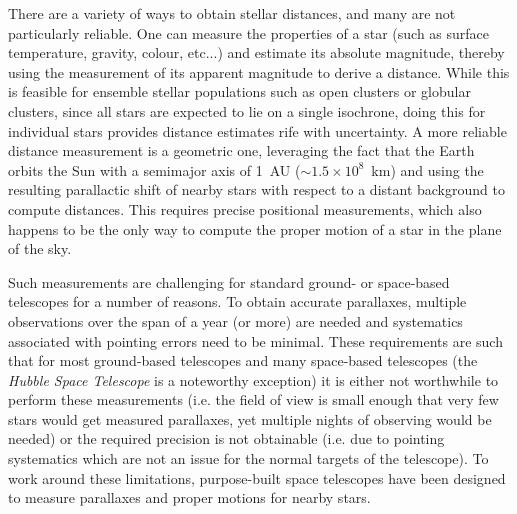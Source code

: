 There are a variety of ways to obtain stellar distances, and many are not particularly reliable. One can measure the properties of a star (such as surface temperature, gravity, colour, etc...) and estimate its absolute magnitude, thereby using the measurement of its apparent magnitude to derive a distance. While this is feasible for ensemble stellar populations such as open clusters or globular clusters, since all stars are expected to lie on a single isochrone, doing this for individual stars provides distance estimates rife with uncertainty. A more reliable distance measurement is a geometric one, leveraging the fact that the Earth orbits the Sun with a semimajor axis of 1~AU ($\sim 1.5 \times 10^{8}$~km) and using the resulting parallactic shift of nearby stars with respect to a distant background to compute distances. This requires precise positional measurements, which also happens to be the only way to compute the proper motion of a star in the plane of the sky.

Such measurements are challenging for standard ground- or space-based telescopes for a number of reasons. To obtain accurate parallaxes, multiple observations over the span of a year (or more) are needed and systematics associated with pointing errors need to be minimal. These requirements are such that for most ground-based telescopes and many space-based telescopes (the \textit{Hubble Space Telescope} is a noteworthy exception) it is either not worthwhile to perform these measurements (i.e. the field of view is small enough that very few stars would get measured parallaxes, yet multiple nights of observing would be needed) or the required precision is not obtainable (i.e. due to pointing systematics which are not an issue for the normal targets of the telescope). To work around these limitations, purpose-built space telescopes have been designed to measure parallaxes and proper motions for nearby stars.

